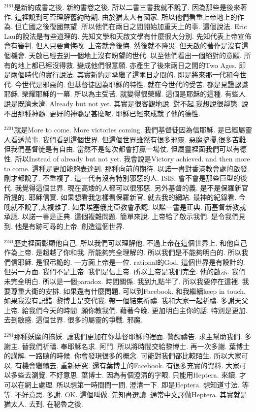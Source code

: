 \documentclass{book}
\begin{document}
$^{2161}$是新約成書之後.
新約書卷之後.
所以二書三書我就不說了.
因為那些是後來著作.
這裡說到可否理解舊約時期.
由於猶太人有國家.
所以他們看重上帝地上的作為.
但亡國之後復國無望.
所以他們在兩日之間開始加重天上的事.
這個說法.
Eric Lau的說法是有些道理的.
先知文學和天啟文學有什麼很大分別.
先知代表上帝宣佈會有審判.
但人只要肯悔改.
上帝就會後悔.
然後就不降災.
但天啟的著作是沒有這個機會.
天啟已經去到一個地上沒有盼望的世代.
以至他們看出一個絕對的意願.
所有的地上都已經沒得救.
變成他們很意願.
亦產生了後來兩日之間的Two Ages.
即是兩個時代的實行說法.
其實新約是承繼了這兩日之間的.
即是將來那一代和今世代.
今世代是邪惡的.
但基督徒因為耶穌的特性.
就在今世代的受苦.
都是見證認識耶穌.
榮耀耶穌的一幕.
所以為主受苦.
就變得很榮耀.
這個是耶穌的這種.
有些人說是既濟未濟.
Already but not yet.
其實是很客觀地說.
對不起,我想說很靜態.
說不出那種神髓.
更好的神髓是甚麼呢.
耶穌已經來成就了他的德性.

$^{2201}$就是More to come.
More victories coming.
我們基督徒因為信耶穌.
是已經屬靈人看透萬事.
我們看到這個世界.
但這個世界雖然有很多邪靈.
惡魔搞擾,很多苦難.
但我們基督徒是有自由.
當然不是每次都會打贏一場仗.
但屬靈裡面我們可以有德性.
所以Instead of already but not yet.
我會說是Victory achieved.
and then more to come.
這種是更加能夠表達到.
那種向前的期待.
以諾一書對香港教會處的啟發.
剛才都說了.
不重複了.
這一代有沒有特別邪惡的人.
ISIS.
會不會是那些巨型的後代.
我覺得這個世界.
現在高矮的人都可以很邪惡.
另外基督的義.
是不是保羅新官所提的.
耶穌信實.
如果想看我怎樣看保羅新官.
就去我的網站.
最神的紀錄看.
今晚就不說了,太複雜了.
如果埃塞俄比亞教會承認.
以諾一書是正典.
而基督新教就承認.
以諾一書是正典.
這個複雜問題.
簡單來說.
上帝給了啟示我們.
是令我們見到.
他是有跡可尋的上帝.
創造這個世界.

$^{2241}$歷史裡面彰顯他自己.
所以我們可以理解他.
不過上帝在這個世界上.
和他自己作為上帝.
是超越了你和我.
所能夠完全理解的.
所以我們是不能夠明白的.
所以我們信耶穌.
是很弔詭的.
一方面上帝是一位.
rational的God.
這個世界是有設計的.
但另一方面.
我們不是上帝.
我們是信上帝.
所以上帝是我們完全.
他的啟示.
我們未完全明白.
所以是一個paradox.
時間關係.
我到九點半了.
所以我要停在這裡.
我要尊重大衛的安排.
如果還有什麼問題.
可以到Facebook.
和我繼續keep in touch.
如果我沒有記錯.
黎博士是交代我.
帶一個結束祈禱.
我和大家一起祈禱.
多謝天父上帝.
給我們今天的時間.
願你教我們.
藉著今晚.
更加明白主你的話.
特別是更加.
去到敏感.
這個世界.
很多的屬靈的爭戰.
邪魔.

$^{2281}$那種妖魔的搞妖.
讓我們更加在你基督耶穌的裡面.
警醒禱告.
求主幫助我們.
多謝主.
替我們祈禱.
奉耶穌名求.
阿門.
所以將時間交給黎博士.
再一次多謝.
葉博士的講解.
一路聽的時候.
你會發現很多的概念.
可能對我們都比較陌生.
所以大家可以.
有機會繼續去.
重新研究.
還有葉博士的Facebook.
有很多充實的資料.
大家可以多些去瀏覽.
不好意思.
葉博士.
因為有個澄清的字眼.
只能用Heptera.
來讀.
才可以在網上處理.
所以想第一時間問一問.
澄清一下.
即是Heptera.
想知道寸法.
等等.
不好意思.
多謝.
OK.
這個叫做.
先知書選讀.
通常中文譯做Heptera.
其實就是猶太人.
去到.
在秘魯之後.
\end{document}
